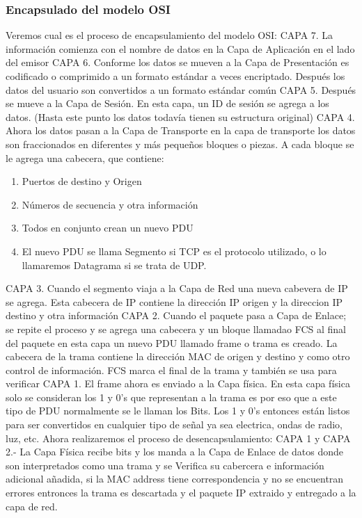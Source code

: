 		\subsubsection{Encapsulado del modelo OSI}
			Veremos cual es el proceso de encapsulamiento del modelo OSI:
		\vskip 1pt
		CAPA 7. La informaci\'on comienza con el nombre de datos en la Capa de Aplicaci\'on en el lado del emisor
		\vskip 0.25pt
		CAPA 6. Conforme los datos se mueven a la Capa de Presentaci\'on es codificado o comprimido a un formato est\'andar a veces encriptado. Despu\'es los datos del usuario son convertidos a un formato est\'andar com\'un
	\vskip 0.25pt
		CAPA 5. Despu\'es se mueve a la Capa de Sesi\'on. En esta capa, un ID de sesi\'on se agrega a los datos. (Hasta este punto los datos todav\'ia tienen su estructura original)
		\vskip 0.25pt
		CAPA 4. Ahora los datos pasan a la Capa de Transporte en la capa de transporte los datos son fraccionados en diferentes y m\'as peque\~nos bloques o piezas. A cada bloque se le agrega una cabecera, que contiene:
		\begin{enumerate}
			\item Puertos de destino y Origen 
			\item N\'umeros de secuencia y otra informaci\'on 
			\item Todos en conjunto crean un nuevo PDU
			\item El nuevo PDU se llama Segmento si TCP es el protocolo utilizado, o lo llamaremos Datagrama si se trata de UDP.
		\end{enumerate}
		\vskip 0.25pt
		CAPA 3. Cuando el segmento viaja a la Capa de Red una nueva cabevera de IP se agrega. Esta cabecera de IP contiene la direcci\'on IP origen y la direccion IP destino y otra informaci\'on
\vskip 0.25pt
		CAPA 2. Cuando el paquete pasa a Capa de Enlace; se repite el proceso y se agrega una cabecera y un bloque llamadao FCS al final del paquete en esta capa un nuevo PDU llamado frame o trama es creado. La cabecera de la trama contiene  la direcci\'on MAC de origen y destino y como otro control de informaci\'on. FCS marca el final de la trama y tambi\'en se usa para verificar
\vskip 0.25pt
		CAPA 1. El frame ahora es enviado a la Capa f\'isica. En esta capa f\'isica solo se consideran los 1 y 0's que representan a la trama es por eso que a este tipo de PDU normalmente se le llaman los Bits. Los 1 y 0's entonces est\'an listos para ser convertidos en cualquier tipo de se\~nal ya sea electrica, ondas de radio, luz, etc.
\vskip 1pt
		Ahora realizaremos el proceso de desencapsulamiento: 
\vskip 0.25pt
		 CAPA 1 y CAPA 2.- La Capa F\'isica recibe bits y los manda a la Capa de Enlace de datos donde son interpretados como una trama y se
Verifica su cabercera e informaci\'on adicional a\~nadida, si la MAC address tiene correspondencia y no se encuentran errores entronces la trama es descartada y el paquete IP extraido y entregado a la capa de red.

